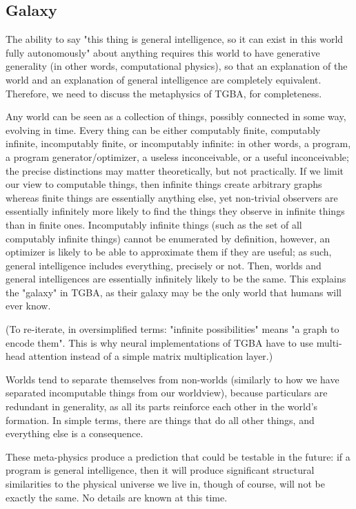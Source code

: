 \documentclass{article}
\begin{document}
\subsection{Galaxy}

The ability to say "this thing is general intelligence, so it can exist in this world fully autonomously" about anything requires this world to have generative generality (in other words, computational physics), so that an explanation of the world and an explanation of general intelligence are completely equivalent. Therefore, we need to discuss the metaphysics of TGBA, for completeness.

Any world can be seen as a collection of things, possibly connected in some way, evolving in time. Every thing can be either computably finite, computably infinite, incomputably finite, or incomputably infinite: in other words, a program, a program generator/optimizer, a useless inconceivable, or a useful inconceivable; the precise distinctions may matter theoretically, but not practically. If we limit our view to computable things, then infinite things create arbitrary graphs whereas finite things are essentially anything else, yet non-trivial observers are essentially infinitely more likely to find the things they observe in infinite things than in finite ones. Incomputably infinite things (such as the set of all computably infinite things) cannot be enumerated by definition, however, an optimizer is likely to be able to approximate them if they are useful; as such, general intelligence includes everything, precisely or not. Then, worlds and general intelligences are essentially infinitely likely to be the same. This explains the "galaxy" in TGBA, as their galaxy may be the only world that humans will ever know.

(To re-iterate, in oversimplified terms: "infinite possibilities" means "a graph to encode them". This is why neural implementations of TGBA have to use multi-head attention instead of a simple matrix multiplication layer.)

Worlds tend to separate themselves from non-worlds (similarly to how we have separated incomputable things from our worldview), because particulars are redundant in generality, as all its parts reinforce each other in the world's formation. In simple terms, there are things that do all other things, and everything else is a consequence.

These meta-physics produce a prediction that could be testable in the future: if a program is general intelligence, then it will produce significant structural similarities to the physical universe we live in, though of course, will not be exactly the same. No details are known at this time.
\end{document}
